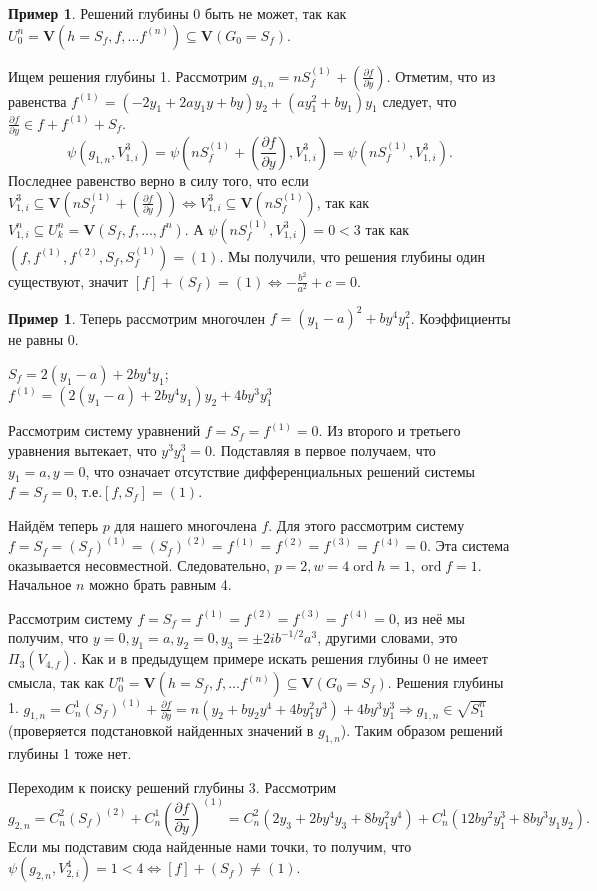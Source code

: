 \documentclass[16pt]{article}
\DeclareMathOperator{\ord}{ord}
\theoremstyle{plain1}
\theoremstyle{plain2}
\theoremstyle{plain}
\theoremstyle{plain3}
\theoremstyle{definition}
\newtheorem{example}[theorem3]{Пример}
\theoremstyle{remark}
\begin{document}
\begin{example}
Решений глубины 0 быть не может, так как ${U}_0^n = \mathbf{V}(h=S_f,f,\ldots f^{(n)})\subseteq\mathbf{V}(G_0=S_f)$.

Ищем решения глубины 1. Рассмотрим $g_{1,n}=nS_f^{(1)}+(\frac{\partial f}{\partial y})$. Отметим, что из равенства $f^{(1)}=(-2y_1+2ay_1y+by)y_2+(ay_1^2+by_1)y_1$ следует, что $\frac{\partial f}{\partial y} \in f+f^{(1)}+S_f$. 
  $$
  \psi( g_{1,n},{V}_{1,i}^3)=\psi( nS_f^{(1)}+(\frac{\partial f}{\partial y}),{V}_{1,i}^3)=\psi( nS_f^{(1)},{V}_{1,i}^3).
  $$
Последнее равенство верно в силу того, что если ${V}_{1,i}^3\subseteq \mathbf{V}(nS_f^{(1)}+(\frac{\partial f}{\partial y}))\Leftrightarrow {V}_{1,i}^3\subseteq \mathbf{V}(nS_f^{(1)})$, так как ${V}_{1,i}^n\subseteq {U}_k^n=\mathbf{V}(S_f,f,\ldots,f^{n})$. А $\psi( nS_f^{(1)},{V}_{1,i}^3)= 0<3$ так как $\left(f,f^{(1)},f^{(2)},S_f, S_f^{(1)}\right)=(1)$. Мы получили, что решения глубины один существуют, значит $[f]+(S_f)=(1)\Leftrightarrow -\frac{b^2}{a^2}+c=0$.



\end{example}



\begin{example}
 Теперь рассмотрим многочлен $f =
(y_1-a)^2+by^4y_1^2$. Коэффициенты не равны 0.

$S_f=2(y_1-a)+2by^4y_1$;
\\
$f^{(1)}=(2(y_1-a)+2by^4y_1)y_2+4by^3y_1^3$

Рассмотрим систему уравнений $f=S_f=f^{(1)}=0$. Из второго и
третьего уравнения вытекает, что $y^3y_1^3=0$. Подставляя в первое
получаем, что $y_1=a, y=0$, что означает отсутствие дифференциальных
решений системы $f=S_f=0$, т.е.$[f,S_f]=(1)$.

Найдём теперь  $p$ для нашего многочлена $f$. Для этого рассмотрим
систему $f=S_f=(S_f)^{(1)}=(S_f)^{(2)}=f^{(1)}=f^{(2)}=f^{(3)}=f^{(4)}=0$. Эта система оказывается несовместной. Следовательно,
$p=2,w=4\ord{h}=1,\ord{f}=1$. Начальное $n$  можно брать равным 4.

Рассмотрим систему $f=S_f=f^{(1)}=f^{(2)}=f^{(3)}=f^{(4)}=0$, из неё мы получим, что $y=0,y_1=a,y_2=0,y_3=\pm2ib^{-1/2}a^3$, другими словами, это $\Pi_3({V}_{4,f})$. 
Как и в предыдущем примере искать решения глубины 0 не имеет смысла, так как ${U}_0^n = \mathbf{V}(h=S_f,f,\ldots f^{(n)})\subseteq\mathbf{V}(G_0=S_f)$.  Решения глубины 1. $g_{1,n}=C_n^1(S_f)^{(1)}+\frac{\partial f}{\partial y}=n(y_2+by_2y^4+4by_1^2y^3)+4by^3y_1^3\Rightarrow g_{1,n}\in\sqrt{S_1^n}$ (проверяется подстановкой найденных значений в $g_{1,n}$).  Таким образом решений глубины 1 тоже нет.

Переходим к поиску решений глубины 3. Рассмотрим $$g_{2,n}=C_n^2(S_f)^{(2)}+C_n^1\left(\frac{\partial
f}{\partial
y}\right)^{(1)}=C_n^2(2y_3+2by^4y_3+8by_1^2y^4)+C_n^1(12by^2y_1^3+8by^3y_1y_2).$$
Если мы подставим сюда найденные нами точки, то получим, что
$\psi(g_{2,n},{V}_{2,i}^4)= 1 <4\Leftrightarrow [f]+(S_f)\not=(1).$


\end{example}
\end{document}
